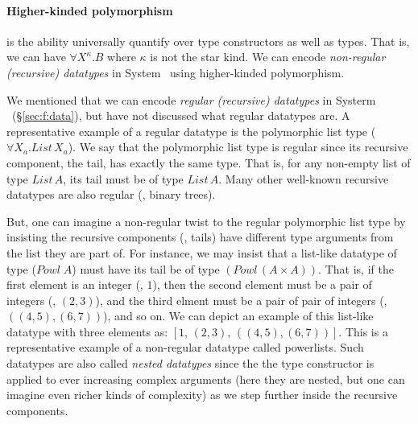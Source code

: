 \paragraph{Higher-kinded polymorphism} is the ability universally quantify
over type constructors as well as types. That is, we can have
$\forall X^\kappa.B$ where $\kappa$ is not the star kind.
We can encode \emph{non-regular (recursive) datatypes} in System \Fw\ using
higher-kinded polymorphism.

We mentioned that we can encode \emph{regular (recursive) datatypes}
in Systerm \F\ (\S\ref{sec:f:data}), but have not discussed
what regular datatypes are. A representative example of a regular datatype
is the polymorphic list type ($\forall X_a.\textit{List}\,X_a$).
We say that the polymorphic list type is regular since its recursive
component, the tail, has exactly the same type. That is, for any
non-empty list of type $\textit{List}\,A$, its tail must be of type $\textit{List}\,A$.
Many other well-known recursive datatypes are also regular (\eg, binary trees).

But, one can imagine a non-regular twist to the regular polymorphic list type
by insisting the recursive components (\ie, tails) have different
type arguments from the list they are part of. For instance, we may insist
that a list-like datatype of type ($\textit{Powl}\;A$) must have its tail be
of type $(\textit{Powl}\,(A\times A))$. That is, if the first element is
an integer (\eg, $1$), then the second element must be a pair of integers
(\eg, $(2,3)$), and the third elment must be a pair of pair of integers
(\eg, $((4,5),(6,7))$), and so on. We can depict an example of this list-like
datatype with three elements as: $[1,\,(2,3),\,((4,5),(6,7))]$.
This is a representative example of a non-regular datatype called powerlists.
Such datatypes are also called \emph{nested datatypes} %
since the the type constructor is applied to ever increasing complex arguments
(here they are nested, but one can imagine even richer kinds of complexity)
as we step further inside the recursive components.

